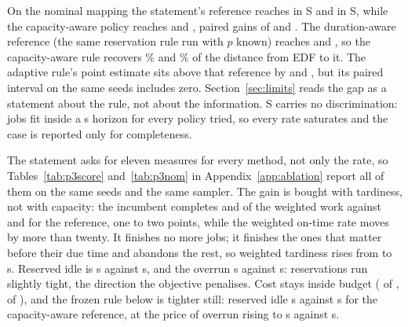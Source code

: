 \documentclass{swmcmthesis}
\begin{document}
On the nominal mapping the statement's reference reaches
\slotPStochSTwoEDFOldETA{} in S\slotCaseTwo{} and \slotPStochSThreeEDFOldETA{} in
S\slotCaseThree, while the capacity-aware policy reaches
\slotPStochSTwoSlackOldETA{} and \slotPStochSThreeSlackOldETA, paired gains of
\slotPStochPairSTwoEDFOldDiff{} and \slotPStochPairSThreeEDFOldDiff{}. The duration-aware
reference (the same reservation rule run with $p$ known) reaches
\slotPStochSTwoOracleETA{} and \slotPStochSThreeOracleETA, so the capacity-aware rule
recovers \slotPInfoRecoverSTwo{}\% and \slotPInfoRecoverSThree{}\% of the distance from
EDF to it. The adaptive rule's point estimate sits above that reference by
\slotPInfoAdvSTwo{} and \slotPInfoAdvSThree, but its paired interval on the same seeds
includes zero. Section~\ref{sec:limits} reads the gap as a statement about the
rule, not about the information. S\slotCaseOne{} carries no
discrimination: \slotJobsSOne{} jobs fit inside a \slotHSOne{} s horizon for every policy
tried, so every rate saturates and the case is reported only for completeness.

The statement asks for eleven measures for every method, not only the rate, so
Tables~\ref{tab:p3score} and~\ref{tab:p3nom} in Appendix~\ref{app:ablation} report all of
them on the same seeds and the same sampler. The gain is bought with tardiness, not with
capacity: the incumbent completes \slotPStochSTwoSlackOldComp{} and
\slotPStochSThreeSlackOldComp{} of the weighted work against
\slotPStochSTwoEDFOldComp{} and \slotPStochSThreeEDFOldComp{} for the reference, one to two
points, while the weighted on-time rate moves by more than twenty. It finishes no more
jobs; it finishes the ones that matter before their due time and abandons the rest, so
weighted tardiness rises from \slotPStochSTwoEDFOldTard{} to \slotPStochSTwoSlackOldTard{}
s. Reserved idle is \slotPStochSTwoSlackOldIdle{} s against \slotPStochSTwoEDFOldIdle{} s,
and the overrun \slotPStochSTwoSlackOldOverrun{} s against
\slotPStochSTwoEDFOldOverrun{} s: reservations run slightly tight, the direction the
objective penalises. Cost stays inside budget (\slotPStochSTwoSlackOldCost{} of
\slotBudgetSTwo{}, \slotPStochSThreeSlackOldCost{} of \slotBudgetSThree{}), and the frozen
rule below is tighter still: reserved idle \slotPIdleSTwoOurs{} s against
\slotPIdleSTwoSlack{} s for the capacity-aware reference, at the price of overrun rising to
\slotPOverrunSTwoOurs{} s against \slotPOverrunSTwoSlack{} s.
\end{document}
